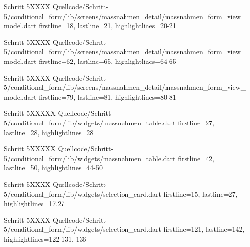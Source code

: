   \begin{alexlistingzwei}{Schritt 5}{XXXX}
    {Quellcode/Schritt-5/conditional_form/lib/screens/massnahmen_detail/massnahmen_form_view_model.dart}
    {firstline=18, lastline=21, highlightlines={20-21}}
    \label{lst:Schritt5XXXXX}
  \end{alexlistingzwei}

  \begin{alexlistingzwei}{Schritt 5}{XXXX}
    {Quellcode/Schritt-5/conditional_form/lib/screens/massnahmen_detail/massnahmen_form_view_model.dart}
    {firstline=62, lastline=65, highlightlines={64-65}}
    \label{lst:Schritt5XXXXX}
  \end{alexlistingzwei}

  \begin{alexlistingzwei}{Schritt 5}{XXXX}
    {Quellcode/Schritt-5/conditional_form/lib/screens/massnahmen_detail/massnahmen_form_view_model.dart}
    {firstline=79, lastline=81, highlightlines={80-81}}
    \label{lst:Schritt5XXXXX}
  \end{alexlistingzwei}

  \begin{alexlistingzwei}{Schritt 5}{XXXXX}
    {Quellcode/Schritt-5/conditional_form/lib/widgets/massnahmen_table.dart}
    {firstline=27, lastline=28, highlightlines={28}}
    \label{lst:Schritt5XXXXX}
  \end{alexlistingzwei}

  \begin{alexlistingzwei}{Schritt 5}{XXXXX}
    {Quellcode/Schritt-5/conditional_form/lib/widgets/massnahmen_table.dart}
    {firstline=42, lastline=50, highlightlines={44-50}}
    \label{lst:Schritt5XXXXX}
  \end{alexlistingzwei}

  \begin{alexlistingzwei}{Schritt 5}{XXXX}
    {Quellcode/Schritt-5/conditional_form/lib/widgets/selection_card.dart}
    {firstline=15, lastline=27, highlightlines={17,27}}
    \label{lst:Schritt5XXXX}
\end{alexlistingzwei}

\begin{alexlistingzwei}{Schritt 5}{XXXX}
    {Quellcode/Schritt-5/conditional_form/lib/widgets/selection_card.dart}
    {firstline=121, lastline=142, highlightlines={122-131, 136}}
    \label{lst:Schritt5XXXX}
\end{alexlistingzwei}